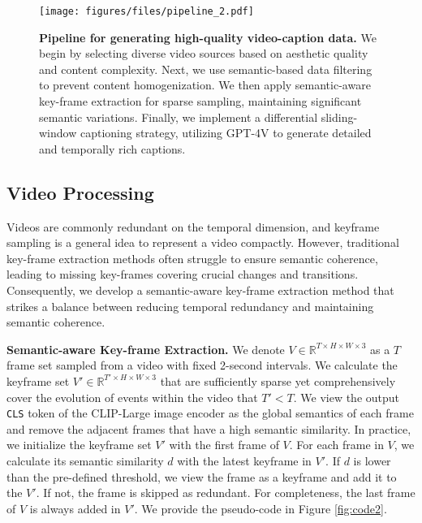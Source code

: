 \begin{figure*}[!t]
    \centering
    \texttt{[image: figures/files/pipeline\_2.pdf]}
    \caption{\textbf{Pipeline for generating high-quality video-caption data.}
    We begin by selecting diverse video sources based on aesthetic quality and content complexity. Next, we use semantic-based data filtering to prevent content homogenization. We then apply semantic-aware key-frame extraction for sparse sampling, maintaining significant semantic variations. Finally, we implement a differential sliding-window captioning strategy, utilizing GPT-4V to generate detailed and temporally rich captions.
    }
    \label{fig:pipeline1}
\end{figure*}
\subsection{Video Processing}
\label{sec:processing}
Videos are commonly redundant on the temporal dimension, and keyframe sampling is a general idea to represent a video compactly.  
However, traditional key-frame extraction methods \cite{zhuang1998adaptive,calic2002efficient} often struggle to ensure semantic coherence, leading to missing key-frames covering crucial changes and transitions. Consequently, we develop a semantic-aware key-frame extraction method that strikes a balance between reducing temporal redundancy and maintaining semantic coherence.

\textbf{Semantic-aware Key-frame Extraction.} 
We denote ${V} \in {\mathbb{R}^{T \times H \times W \times 3}}$ as a $T$ frame set sampled from a video with fixed 2-second intervals.
We calculate the keyframe set ${V'} \in {\mathbb{R}^{T' \times H \times W \times 3}}$ that are sufficiently sparse yet comprehensively cover the evolution of events within the video that $T' < T$. We view the output \texttt{CLS} token of the CLIP-Large image encoder \cite{radford2021learning} as the global semantics of each frame and remove the adjacent frames that have a high semantic similarity. In practice, we initialize the keyframe set $V'$ with the first frame of $V$. For each frame in $V$, we calculate its semantic similarity $d$ with the latest keyframe in $V'$. If $d$ is lower than the pre-defined threshold, we view the frame as a keyframe and add it to the $V'$. If not, the frame is skipped as redundant. For completeness, the last frame of $V$ is always added in $V'$. We provide the pseudo-code in Figure \ref{fig:code2}.

